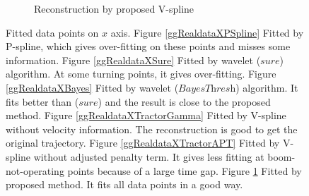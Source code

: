 \begin{figure}
\begin{subfigure}{0.45\textwidth}
    \caption{Reconstruction by proposed V-spline}\label{ggRealdataXTractor}
    \end{subfigure}
 \caption{Fitted data points on $x$ axis. Figure \ref{ggRealdataXPSpline} Fitted by P-spline, which gives over-fitting on these points and misses some information. Figure \ref{ggRealdataXSure} Fitted by wavelet ($\textit{sure}$) algorithm. At some turning points, it gives over-fitting. Figure \ref{ggRealdataXBayes} Fitted by wavelet ($\textit{BayesThresh}$) algorithm. It fits better than ($\textit{sure}$) and the result is close to the proposed method. Figure \ref{ggRealdataXTractorGamma} Fitted by V-spline without velocity information. The reconstruction is good to get the original trajectory. Figure \ref{ggRealdataXTractorAPT} Fitted by V-spline without adjusted penalty term. It gives less fitting at boom-not-operating points because of a large time gap. Figure \ref{ggRealdataXTractor} Fitted by proposed method. It fits all data points in a good way.}\label{1dx}
 \end{figure}





